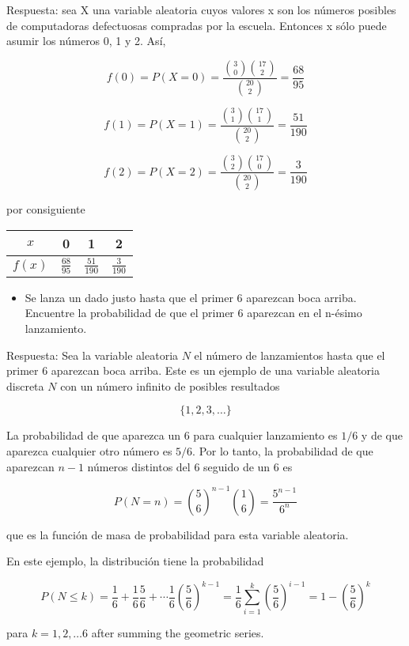 \documentclass[11pt]{article}
\providecommand{\tightlist}{%
      \setlength{\itemsep}{0pt}\setlength{\parskip}{0pt}}
\begin{document}
Respuesta: sea X una variable aleatoria cuyos valores x son los números
posibles de computadoras defectuosas compradas por la escuela. Entonces
x sólo puede asumir los números 0, 1 y 2. Así,

\[
f(0)=P(X=0)= \frac{\binom{3}{0} \binom{17}{2} }{\binom{20}{2}}=\frac{68}{95}
\]

\[
f(1)=P(X=1)= \frac{\binom{3}{1} \binom{17}{1} }{\binom{20}{2}}=\frac{51}{190}
\]

\[
f(2)=P(X=2)= \frac{\binom{3}{2} \binom{17}{0} }{\binom{20}{2}}=\frac{3}{190}
\]

por consiguiente

\begin{longtable}[]{@{}cccc@{}}
\toprule
\(x\) & 0 & 1 & 2\tabularnewline
\midrule
\endhead
\(f(x)\) & \(\frac{68}{95}\) & \(\frac{51}{190}\) &
\(\frac{3}{190}\)\tabularnewline
\bottomrule
\end{longtable}

\begin{itemize}
\tightlist
\item
  Se lanza un dado justo hasta que el primer 6 aparezcan boca arriba.
  Encuentre la probabilidad de que el primer 6 aparezcan en el n-ésimo
  lanzamiento.
\end{itemize}

Respuesta: Sea la variable aleatoria \(N\) el número de lanzamientos
hasta que el primer 6 aparezcan boca arriba. Este es un ejemplo de una
variable aleatoria discreta \(N\) con un número infinito de posibles
resultados

\[
\lbrace 1, 2, 3, \ldots \rbrace 
\]

La probabilidad de que aparezca un \(6\) para cualquier lanzamiento es
\(1/6\) y de que aparezca cualquier otro número es \(5/6\). Por lo
tanto, la probabilidad de que aparezcan \(n - 1\) números distintos del
\(6\) seguido de un 6 es

\[
P(N=n)= \binom{5}{6}^{n-1} \binom{1}{6}= \frac{5^{n-1}}{6^{n}}
\]

que es la función de masa de probabilidad para esta variable aleatoria.

En este ejemplo, la distribución tiene la probabilidad

\[
P(N \leq k) = \frac{1}{6}+ \frac{1}{6}\frac{5}{6} + \cdots \frac{1}{6}\left(\frac{5}{6}\right)^{k-1} = \frac{1}{6} \displaystyle \sum_{i=1}^{k}{\left(\frac{5}{6}\right)}^{i-1}= 1- \left(\frac{5}{6}\right)^{k}
\]

para \(k = 1, 2, \ldots 6\) after summing the geometric series.
\end{document}

